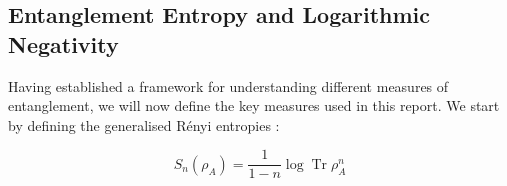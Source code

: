 
 






\subsection{Entanglement Entropy and Logarithmic Negativity}\label{subsec:entropy_negativity}
Having established a framework for understanding different measures of entanglement, we will now define the key measures used in this report. We start by defining the generalised Rényi entropies \cite{renyi_entropy}:

\begin{equation}\label{eq:renyi_entropy}
S_{n}\left(\rho_{A}\right)=\frac{1}{1-n} \log \operatorname{Tr} \rho_{A}^{n}
\end{equation}

